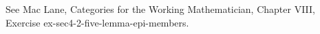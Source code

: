 See Mac Lane, Categories for the Working Mathematician, Chapter VIII, Exercise ex-sec4-2-five-lemma-epi-members.
